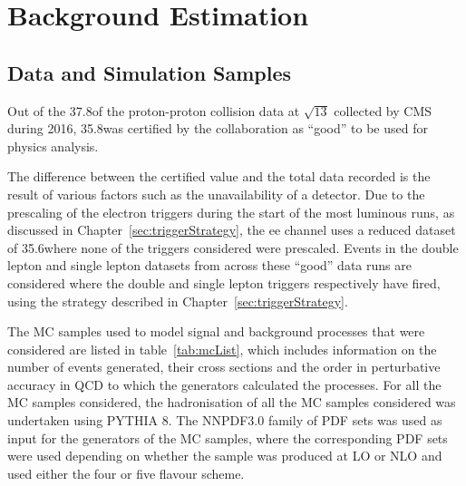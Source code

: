 \chapter{Background Estimation}\label{chapter:bkg}
%
%
%
%

\section{Data and Simulation Samples}\label{sec:samples}
Out of the 37.8\fbinv of the proton-proton collision data at $\sqrt{13}$ collected by CMS during 2016, 35.8\fbinv was certified by the collaboration as ``good'' to be used for physics analysis.

The difference between the certified value and the total data recorded is the result of various factors such as the unavailability of a detector.
Due to the prescaling of the electron triggers during the start of the most luminous runs, as discussed in Chapter~\ref{sec:triggerStrategy}, the ee channel uses a reduced dataset of 35.6\fbinv where none of the triggers considered were prescaled.
Events in the double lepton and single lepton datasets from across these ``good'' data runs are considered where the double and single lepton triggers respectively have fired, using the strategy described in Chapter~\ref{sec:triggerStrategy}.

The MC samples used to model signal and background processes that were considered are listed in table~\ref{tab:mcList}, which includes information on the number of events generated, their cross sections and the order in perturbative accuracy in QCD to which the generators calculated the processes.
For all the MC samples considered, the hadronisation of all the MC samples considered was undertaken using PYTHIA 8.
The NNPDF3.0 family of PDF sets was used as input for the generators of the MC samples, where the corresponding PDF sets were used depending on whether the sample was produced at LO or NLO and used either the four or five flavour scheme.

